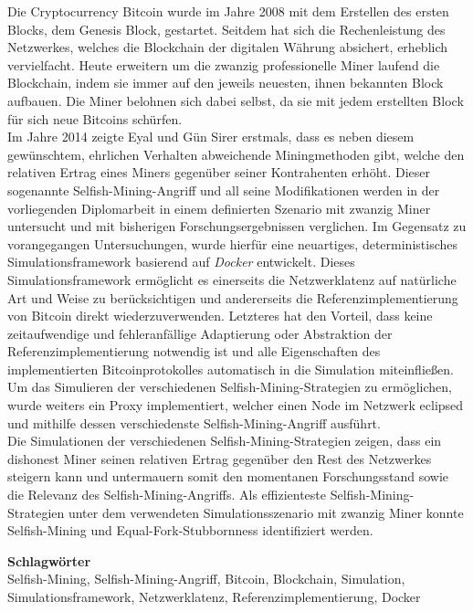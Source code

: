 Die Cryptocurrency Bitcoin wurde im Jahre 2008 mit dem Erstellen des ersten Blocks, dem Genesis Block, gestartet.
Seitdem hat sich die Rechenleistung des Netzwerkes, welches die Blockchain der digitalen Währung absichert, erheblich vervielfacht.
Heute erweitern um die zwanzig professionelle Miner laufend die Blockchain, indem sie immer auf den jeweils neuesten, ihnen bekannten Block aufbauen.
Die Miner belohnen sich dabei selbst, da sie mit jedem erstellten Block für sich neue Bitcoins schürfen.\\
Im Jahre 2014 zeigte Eyal und Gün Sirer erstmals, dass es neben diesem gewünschtem, ehrlichen Verhalten abweichende Miningmethoden gibt, welche den relativen Ertrag eines Miners gegenüber seiner Kontrahenten erhöht.
Dieser sogenannte Selfish-Mining-Angriff und all seine	 Modifikationen werden in der vorliegenden Diplomarbeit in einem definierten Szenario mit zwanzig Miner untersucht und mit bisherigen Forschungsergebnissen verglichen.
Im Gegensatz zu vorangegangen Untersuchungen, wurde hierfür eine neuartiges, deterministisches Simulationsframework basierend auf \textit{Docker} entwickelt. 
Dieses Simulationsframework ermöglicht es einerseits die Netzwerklatenz auf natürliche Art und Weise zu berücksichtigen und andererseits die Referenzimplementierung von Bitcoin direkt wiederzuverwenden.
Letzteres hat den Vorteil, dass keine zeitaufwendige und fehleranfällige Adaptierung oder Abstraktion der Referenzimplementierung notwendig ist und alle Eigenschaften des implementierten Bitcoinprotokolles automatisch in die Simulation miteinfließen.
Um das Simulieren der verschiedenen Selfish-Mining-Strategien zu ermöglichen, wurde weiters ein Proxy implementiert, welcher einen Node im Netzwerk eclipsed und mithilfe dessen verschiedenste Selfish-Mining-Angriff ausführt.\\
Die Simulationen der verschiedenen Selfish-Mining-Strategien zeigen, dass ein dishonest Miner seinen relativen Ertrag gegenüber den Rest des Netzwerkes steigern kann und untermauern somit den momentanen Forschungsstand sowie die Relevanz des Selfish-Mining-Angriffs.
Als effizienteste Selfish-Mining-Strategien unter dem verwendeten Simulationsszenario mit zwanzig Miner konnte Selfish-Mining und Equal-Fork-Stubbornness identifiziert werden. 

\bigskip
\noindent \textbf{Schlagwörter}\\
Selfish-Mining, Selfish-Mining-Angriff, Bitcoin, Blockchain, Simulation, Simulationsframework, Netzwerklatenz, Referenzimplementierung, Docker
